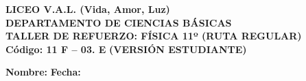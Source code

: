 \documentclass[11pt, letterpaper]{article}
\newif\ifmostrarrespuestas
\begin{document}
	
	\begin{center}
		{\Large \textbf{LICEO V.A.L. (Vida, Amor, Luz)}}\\[0.1cm]
		{\large \textbf{DEPARTAMENTO DE CIENCIAS BÁSICAS}}\\[0.1cm]
		{\large \textbf{TALLER DE REFUERZO: FÍSICA 11º (RUTA REGULAR)}}\\[0.1cm]
		\hfill \textbf{Código: 11 F -- 03. E} 
		\ifmostrarrespuestas \textcolor{blue}{\textbf{(VERSIÓN PROFESOR)}} \else \textbf{(VERSIÓN ESTUDIANTE)} \fi
	\end{center}
	
	\vspace{0.3cm}
	\noindent \textbf{Nombre:} \underline{\hspace{8.5cm}} \textbf{Fecha:} \underline{\hspace{3cm}}
	
	\vspace{0.6cm}
	
\end{document}
